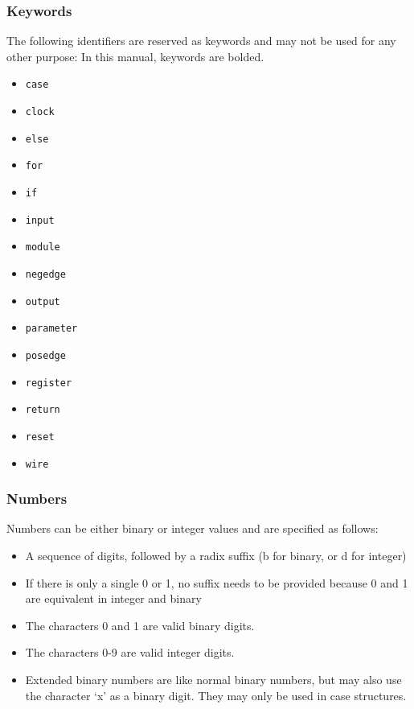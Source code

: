 \documentclass[letterpaper,11pt]{article}
\begin{document}
        \subsubsection{Keywords}
        The following identifiers are reserved as keywords and may not be used for any other purpose: 
        In this manual, keywords are bolded.
        \begin{itemize}
        \item{\texttt{case}}
        \item{\texttt{clock}} 
        \item{\texttt{else}}
        \item{\texttt{for}}
        \item{\texttt{if}}
        \item{\texttt{input}}
        \item{\texttt{module}}
        \item{\texttt{negedge}}
        \item{\texttt{output}}
        \item{\texttt{parameter}}
        \item{\texttt{posedge}}
        \item{\texttt{register}}
        \item{\texttt{return}}
        \item{\texttt{reset}}
        \item{\texttt{wire}}
        \end{itemize}
        \subsubsection{Numbers}
        Numbers can be either binary or integer values and are specified as follows: 
        \begin{itemize}
        \item{A sequence of digits, followed by a radix suffix (b for binary, or d for integer)}
        \item{If there is only a single 0 or 1, no suffix needs to be provided because 0 and 1 are
        equivalent in integer and binary} 
        \item{The characters 0 and 1 are valid binary digits.} 
        \item{The characters 0-9 are valid integer digits.}
        \item{Extended binary numbers are like normal binary numbers, but may also use the
        character ‘x’ as a binary digit. They may only be used in case structures.}
        \end{itemize}
\end{document}
